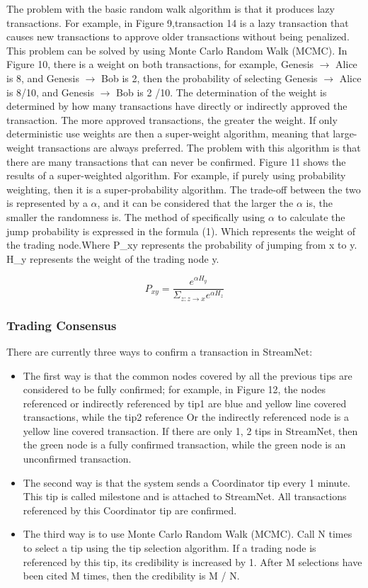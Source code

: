 The problem with the basic random walk algorithm is that it produces lazy transactions. For example, in Figure 9,transaction 14 is a lazy transaction that causes new transactions to approve older transactions without being penalized. This problem can be solved by using Monte Carlo Random Walk (MCMC). In Figure 10, there is a weight on both transactions, for example, Genesis $\rightarrow$ Alice is 8, and Genesis $\rightarrow$ Bob is 2, then the probability of selecting Genesis $\rightarrow$ Alice is 8/10, and Genesis $\rightarrow$ Bob is 2 /10. The determination of the weight is determined by how many transactions have directly or indirectly approved the transaction. The more approved transactions, the greater the weight. If only deterministic use weights are then a super-weight algorithm, meaning that large-weight transactions are always preferred. The problem with this algorithm is that there are many transactions that can never be confirmed. Figure 11 shows the results of a super-weighted algorithm. For example, if purely using probability weighting, then it is a
super-probability algorithm. The trade-off between the two is represented by a $\alpha$, and it can be considered that the
larger the $\alpha$ is, the smaller the randomness is. The method of specifically using $\alpha$ to calculate the jump probability is expressed in the formula (1). Which represents the weight of the trading node.Where P\_{xy} represents the probability of jumping from x to y. H\_{y} represents the weight of the trading node y.

\begin{equation}
\label{simple_equation}
P_{xy} = \frac{e^{\alpha H_{y}}}{\Sigma_{z:z \rightarrow x}e^{\alpha H_{z}}}
\end{equation}

\subsubsection{Trading Consensus}
There are currently three ways to confirm a transaction in StreamNet:
	\begin{itemize}
		\item The first way is that the common nodes covered by all the previous tips are considered to be fully confirmed; for example, in Figure 12, the nodes referenced or indirectly referenced by tip1 are blue and yellow line covered transactions, while the tip2 reference Or the indirectly referenced node is a yellow line covered transaction. If there are only 1, 2 tips in StreamNet, then the green node is a fully confirmed transaction, while the green node is an unconfirmed transaction.
		\item The second way is that the system sends a Coordinator tip every 1 minute. This tip is called milestone and is attached to StreamNet. All transactions referenced by this Coordinator tip are confirmed.
		\item The third way is to use Monte Carlo Random Walk (MCMC). Call N times to select a tip using the tip selection algorithm. If a trading node is referenced by this tip, its credibility is increased by 1. After M selections have been cited M times, then the credibility is M / N.
  \end{itemize}

